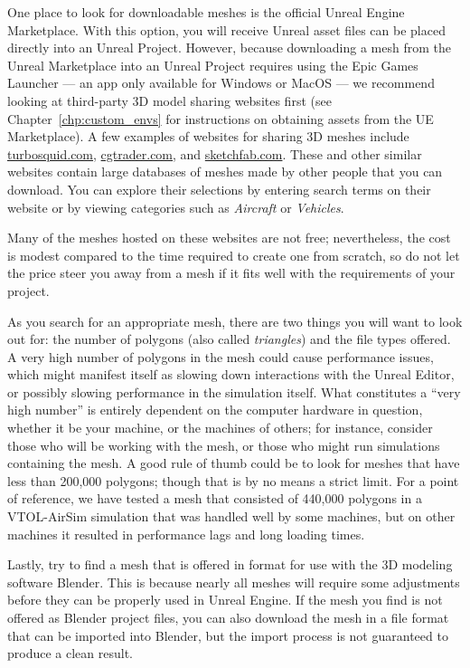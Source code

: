 One place to look for downloadable meshes is the official Unreal Engine Marketplace. With this option, you will receive Unreal asset files can be placed directly into an Unreal Project. However, because downloading a mesh from the Unreal Marketplace into an Unreal Project requires using the Epic Games Launcher --- an app only available for Windows or MacOS --- we recommend looking at third-party 3D model sharing websites first (see Chapter~\ref{chp:custom_envs} for instructions on obtaining assets from the UE Marketplace). A few examples of websites for sharing 3D meshes include \url{turbosquid.com}, \url{cgtrader.com}, and \url{sketchfab.com}. These and other similar websites contain large databases of meshes made by other people that you can download. You can explore their selections by entering search terms on their website or by viewing categories such as \textit{Aircraft} or \textit{Vehicles}.

Many of the meshes hosted on these websites are not free; nevertheless, the cost is modest compared to the time required to create one from scratch, so do not let the price steer you away from a mesh if it fits well with the requirements of your project.

As you search for an appropriate mesh, there are two things you will want to look out for: the number of polygons (also called \textit{triangles}) and the file types offered. A very high number of polygons in the mesh could cause performance issues, which might manifest itself as slowing down interactions with the Unreal Editor, or possibly slowing performance in the simulation itself. What constitutes a ``very high number'' is entirely dependent on the computer hardware in question, whether it be your machine, or the machines of others; for instance, consider those who will be working with the mesh, or those who might run simulations containing the mesh. A good rule of thumb could be to look for meshes that have less than 200,000 polygons; though that is by no means a strict limit. For a point of reference, we have tested a mesh that consisted of 440,000 polygons in a VTOL-AirSim simulation that was handled well by some machines, but on other machines it resulted in performance lags and long loading times.

Lastly, try to find a mesh that is offered in  format for use with the 3D modeling software Blender. This is because nearly all meshes will require some adjustments before they can be properly used in Unreal Engine. If the mesh you find is not offered as Blender project files, you can also download the mesh in a file format that can be imported into Blender, but the import process is not guaranteed to produce a clean result.

